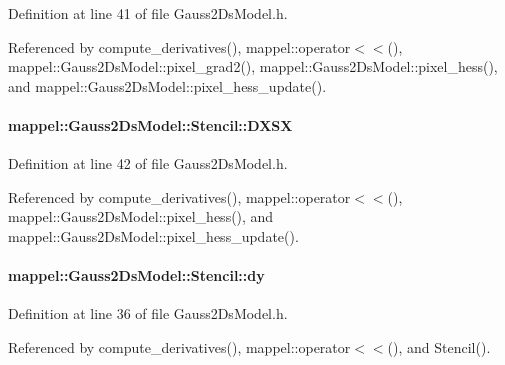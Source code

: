 Definition at line 41 of file Gauss2\+Ds\+Model.\+h.



Referenced by compute\+\_\+derivatives(), mappel\+::operator$<$$<$(), mappel\+::\+Gauss2\+Ds\+Model\+::pixel\+\_\+grad2(), mappel\+::\+Gauss2\+Ds\+Model\+::pixel\+\_\+hess(), and mappel\+::\+Gauss2\+Ds\+Model\+::pixel\+\_\+hess\+\_\+update().

\paragraph[{\texorpdfstring{D\+X\+SX}{DXSX}}]{ mappel\+::\+Gauss2\+Ds\+Model\+::\+Stencil\+::\+D\+X\+SX}\hypertarget{classmappel_1_1Gauss2DsModel_1_1Stencil_a7870df1b758596566193a73f095a1710}{}\label{classmappel_1_1Gauss2DsModel_1_1Stencil_a7870df1b758596566193a73f095a1710}


Definition at line 42 of file Gauss2\+Ds\+Model.\+h.



Referenced by compute\+\_\+derivatives(), mappel\+::operator$<$$<$(), mappel\+::\+Gauss2\+Ds\+Model\+::pixel\+\_\+hess(), and mappel\+::\+Gauss2\+Ds\+Model\+::pixel\+\_\+hess\+\_\+update().

\paragraph[{\texorpdfstring{dy}{dy}}]{ mappel\+::\+Gauss2\+Ds\+Model\+::\+Stencil\+::dy}\hypertarget{classmappel_1_1Gauss2DsModel_1_1Stencil_ad0d07ba138d7b3d500bcfdc7fc157993}{}\label{classmappel_1_1Gauss2DsModel_1_1Stencil_ad0d07ba138d7b3d500bcfdc7fc157993}


Definition at line 36 of file Gauss2\+Ds\+Model.\+h.



Referenced by compute\+\_\+derivatives(), mappel\+::operator$<$$<$(), and Stencil().

